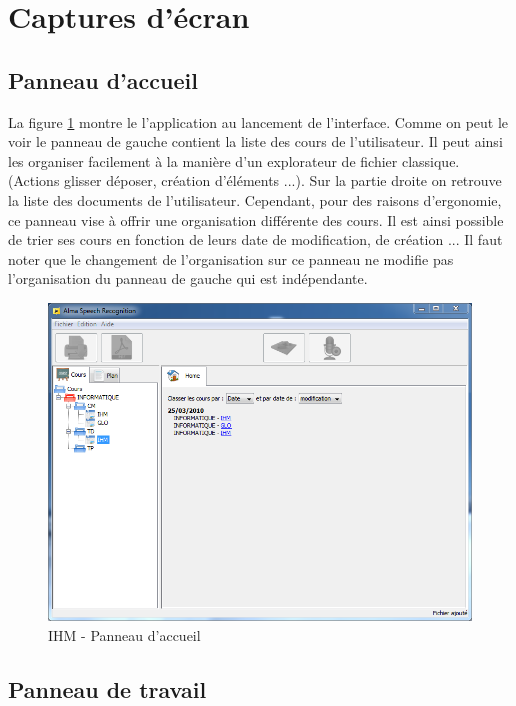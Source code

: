 \section{Captures d'écran}

\subsection{Panneau d'accueil}


La figure \ref{fig:homePanel} montre le l'application au lancement de l'interface. Comme on peut le voir le panneau de gauche contient la liste des cours de l'utilisateur. Il peut ainsi les organiser facilement à la manière d'un explorateur de fichier classique. (Actions glisser déposer, création d'éléments ...). Sur la partie droite on retrouve la liste des documents de l'utilisateur. Cependant, pour des raisons d'ergonomie, ce panneau vise à offrir une organisation différente des cours. Il est ainsi possible de trier ses cours en fonction de leurs date de modification, de création ... Il faut noter que le changement de l'organisation sur ce panneau ne modifie pas l'organisation du panneau de gauche qui est indépendante.


\begin{figure}[H]
 \centering
 \includegraphics[scale=0.6]{./images/homePanel.png}
 \caption{IHM - Panneau d'accueil}
 \label{fig:homePanel}
\end{figure}




\subsection{Panneau de travail}

